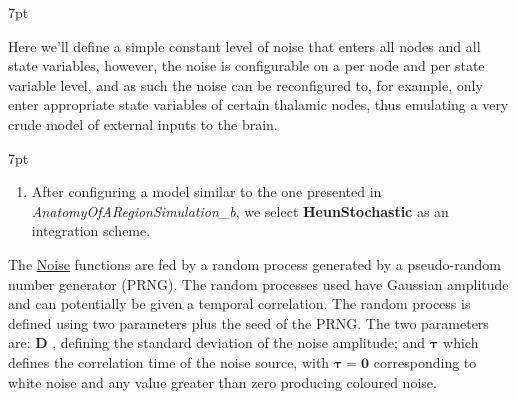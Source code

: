 \documentclass{tufte-handout}
\newenvironment{simulation}{%
  \def\FrameCommand{%
    \hspace{1pt}%
    {\color{ForestGreen}\vrule width 2pt}%
    {\color{simulationshade}\vrule width 4pt}%
    \colorbox{simulationshade}%
  }%
  \MakeFramed{\advance\hsize-\width\FrameRestore}%
  \noindent\hspace{-4.55pt}%
  \begin{adjustwidth}{}{7pt}%
  \vspace{2pt}\vspace{2pt}%
}
{%
  \vspace{2pt}\end{adjustwidth}\endMakeFramed%
}
\newenvironment{blah}{%
  \def\FrameCommand{%
    \hspace{1pt}%
    {\color{DarkOrange}\vrule width 2pt}%
    {\color{PeachPuff}\vrule width 4pt}%
    \colorbox{PeachPuff}%
  }%
  \MakeFramed{\advance\hsize-\width\FrameRestore}%
  \noindent\hspace{-4.55pt}%
  \begin{adjustwidth}{}{7pt}%
  \vspace{2pt}\vspace{2pt}%
}
{%
  \vspace{2pt}\end{adjustwidth}\endMakeFramed%
}
\begin{document}
\begin{blah}
\begin{itemize}
Here we'll define a simple constant level of noise that enters all
nodes and all state variables, however, the noise is configurable on a per
node and per state variable level, and as such the noise can be reconfigured
to, for example, only enter appropriate state variables of certain thalamic
nodes, thus emulating a very crude model of external inputs to the brain. 
\end{itemize}
\end{blah}

\begin{simulation}
\begin{enumerate}
\item After configuring a model similar to the one presented in  \textit{AnatomyOfARegionSimulation\_b}, we select \textbf{HeunStochastic} as an integration scheme.  
\end{enumerate}
\end{simulation}

The \underline{Noise} functions are fed by a random process generated by a
pseudo-random number generator (PRNG). The random processes used have Gaussian
amplitude and can potentially be given a temporal correlation. The random
process is defined using two parameters plus the seed of the PRNG. The two
parameters are: $\mathbf{D}$ ,
defining the standard deviation of the noise amplitude; and
$\boldsymbol{\tau}$ which defines the correlation time of the noise source,
with $\boldsymbol{\tau = 0}$ corresponding to white noise and any value
greater than zero producing coloured noise.
\end{document}
